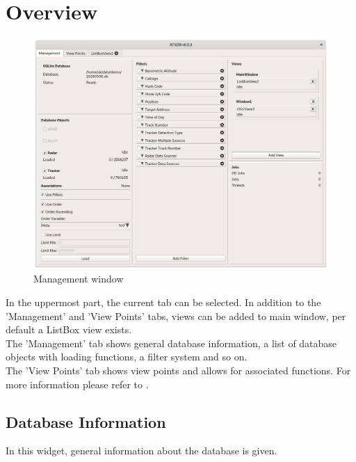 \section{Overview}
\label{sec:management_overview}

\begin{figure}[H]
  \hspace*{-2.5cm}
    \includegraphics[width=19cm]{../screenshots/management.png}
  \caption{Management window}
\end{figure}

In the uppermost part, the current tab can be selected. In addition to the 'Management' and 'View Points' tabs, views can be added to main window, per default a ListBox view exists. \\

The 'Management' tab shows general database information, a list of database objects with loading functions, a filter system and so on. \\

The 'View Points' tab shows view points and allows for associated functions. For more information please refer to .

\subsection{Database Information}

In this widget, general information about the database is given. 

